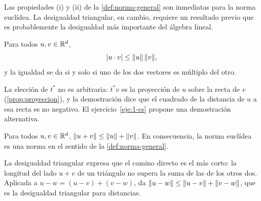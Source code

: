\addtocounter{definicion}{1}%

Las propiedades (i) y (ii) de la \cref{def:norma-general} son inmediatas para la norma euclídea. La desigualdad triangular, en cambio, requiere un resultado previo que es probablemente la desigualdad más importante del álgebra lineal.

\begin{teorema}\label{teo:cs}
Para todos $u,v\in\mathbb{R}^{d}$,
\[
\lvert u\cdot v\rvert\le\lVert u\rVert\,\lVert v\rVert,
\]
y la igualdad se da si y solo si uno de los dos vectores es múltiplo del otro.
\end{teorema}

La elección de $t^{*}$ no es arbitraria: $t^{*}v$ es la proyección de $u$ sobre la recta de $v$ (\cref{prop:proyeccion}), y la demostración dice que el cuadrado de la distancia de $u$ a esa recta es no negativo. El ejercicio~\ref{eje:1-cs} propone una demostración alternativa.

\begin{corolario}\label{cor:triangular}
Para todos $u,v\in\mathbb{R}^{d}$, $\lVert u+v\rVert\le\lVert u\rVert+\lVert v\rVert$. En consecuencia, la norma euclídea es una norma en el sentido de la \cref{def:norma-general}.
\end{corolario}

\begin{observacion}
La desigualdad triangular expresa que el camino directo es el más corto: la longitud del lado $u+v$ de un triángulo no supera la suma de las de los otros dos. Aplicada a $u-w=(u-v)+(v-w)$, da $\lVert u-w\rVert\le\lVert u-v\rVert+\lVert v-w\rVert$, que es la desigualdad triangular para distancias.
\end{observacion}

